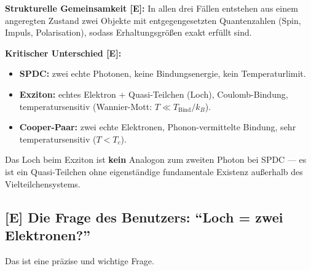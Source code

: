 \begin{center}
\end{center}

\textbf{Strukturelle Gemeinsamkeit [E]:}
In allen drei Fällen entstehen aus einem angeregten Zustand
zwei Objekte mit entgegengesetzten Quantenzahlen
(Spin, Impuls, Polarisation), sodass Erhaltungsgrößen exakt erfüllt sind.

\textbf{Kritischer Unterschied [E]:}
\begin{itemize}
  \item \textbf{SPDC:} zwei echte Photonen, keine Bindungsenergie,
    kein Temperaturlimit.
  \item \textbf{Exziton:} echtes Elektron + Quasi-Teilchen (Loch),
    Coulomb-Bindung, temperatursensitiv (Wannier-Mott: $T \ll T_\text{Bind}/k_B$).
  \item \textbf{Cooper-Paar:} zwei echte Elektronen, Phonon-vermittelte
    Bindung, sehr temperatursensitiv ($T < T_c$).
\end{itemize}

Das Loch beim Exziton ist \textbf{kein} Analogon zum zweiten Photon
bei SPDC --- es ist ein Quasi-Teilchen ohne eigenständige
fundamentale Existenz außerhalb des Vielteilchensystems.

\subsection{[E] Die Frage des Benutzers: ``Loch = zwei Elektronen?''}

Das ist eine präzise und wichtige Frage.


